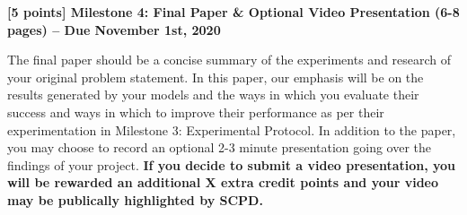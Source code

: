 \clearpage

\large
\textbf{[5 points] Milestone 4: Final Paper \& Optional Video Presentation (6-8 pages) -- Due November 1st, 2020}


\normalsize

The final paper should be a concise summary of the experiments and research of your original problem statement. In this paper, our emphasis will be on the results generated by your models and the ways in which you evaluate their success and ways in which to improve their performance as per their experimentation in Milestone 3: Experimental Protocol. In addition to the paper, you may choose to record an optional 2-3 minute presentation going over the findings of your project. \textbf{If you decide to submit a video presentation, you will be rewarded an additional X extra credit points and your video may be publically highlighted by SCPD.} \vspace{\baselineskip}

